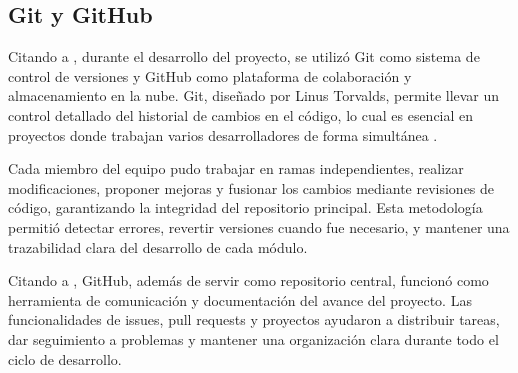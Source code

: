 \subsection{Git y GitHub}

\begin{list}{}%
	{\setlength{\leftmargin}{1cm}\setlength{\rightmargin}{1cm}}
	\item\relax
	\small
	
	Citando a \cite{CitaD20}, durante el desarrollo del proyecto, se utilizó Git como sistema de control de versiones y GitHub como plataforma de colaboración y almacenamiento en la nube. Git, diseñado por Linus Torvalds, permite llevar un control detallado del historial de cambios en el código, lo cual es esencial en proyectos donde trabajan varios desarrolladores de forma simultánea .
	
	Cada miembro del equipo pudo trabajar en ramas independientes, realizar modificaciones, proponer mejoras y fusionar los cambios mediante revisiones de código, garantizando la integridad del repositorio principal. Esta metodología permitió detectar errores, revertir versiones cuando fue necesario, y mantener una trazabilidad clara del desarrollo de cada módulo.
	
	Citando a \cite{CitaD21}, GitHub, además de servir como repositorio central, funcionó como herramienta de comunicación y documentación del avance del proyecto. Las funcionalidades de issues, pull requests y proyectos ayudaron a distribuir tareas, dar seguimiento a problemas y mantener una organización clara durante todo el ciclo de desarrollo.
	
\end{list}


